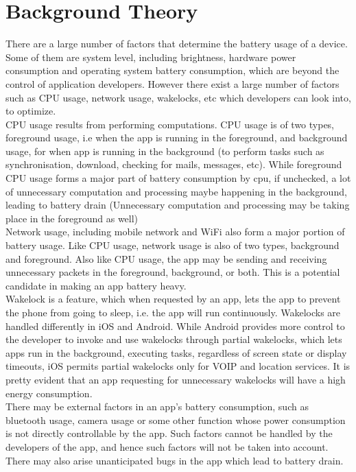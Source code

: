 \setlength\parindent{0pt}

\chapter{Background Theory}

There are a large number of factors that determine the battery usage of a device. Some of them are system level, including brightness, hardware power consumption and operating system battery consumption, which are beyond the control of application developers. However there exist a large number of factors such as CPU usage, network usage, wakelocks, etc which developers can look into, to optimize. \\

CPU usage results from performing computations. CPU usage is of two types, foreground usage, i.e when the app is running in the foreground, and background usage, for when app is running in the background (to perform tasks such as synchronisation, download, checking for mails, messages, etc). While foreground CPU usage forms a major part of battery consumption by cpu, if unchecked, a lot of unnecessary computation and processing maybe happening in the background, leading to battery drain (Unnecessary computation and processing may be taking place in the foreground as well) \\

Network usage, including mobile network and WiFi also form a major portion of battery usage. Like CPU usage, network usage is also of two types, background and foreground. Also like CPU usage, the app may be sending and receiving unnecessary packets in the foreground, background, or both. This is a potential candidate in making an app battery heavy.\\

Wakelock is a feature, which when requested by an app, lets the app to prevent the phone from going to sleep, i.e. the app will run continuously.\cite{wakelock} Wakelocks are handled differently in iOS and Android. While Android provides more control to the developer to invoke and use wakelocks through partial wakelocks, which lets apps run in the background, executing tasks, regardless of screen state or display timeouts, iOS permits partial wakelocks only for VOIP and location services.\cite{stackoverflow} It is pretty evident that an app requesting for unnecessary wakelocks will have a high energy consumption.\\

There may be external factors in an app’s battery consumption, such as bluetooth usage, camera usage or some other function whose power consumption is not directly controllable by the app. Such factors cannot be handled by the developers of the app, and hence such factors will not be taken into account. There may also arise unanticipated bugs in the app which lead to battery drain. 